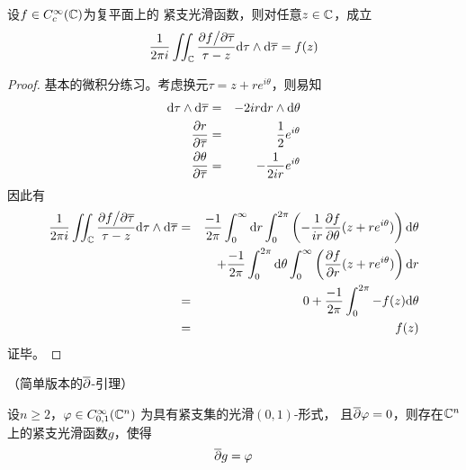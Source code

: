 \begin{lemma}设$f\in C^\infty_c(\mathbb{C})$为复平面上的
紧支光滑函数，则对任意$z\in\mathbb{C}$，成立
$$
  \frac{1}{2\pi i}
  \iint_{\mathbb{C}}
    \frac{\partial f\big/\partial\overline{\tau}}
         {\tau-z}
    \mathrm{d}\tau\wedge\mathrm{d}\overline{\tau}
=f(z)$$
\end{lemma}
\begin{proof}
基本的微积分练习。考虑换元$\tau=z+re^{i\theta}$，则易知
\begin{eqnarray*}
  \mathrm{d}\tau\wedge\mathrm{d}\overline{\tau}&=&-2ir\mathrm{d} r\wedge\mathrm{d}\theta\\
  \frac{\partial r} {\partial \overline{\tau}}&=&\frac{1}{2}e^{i\theta}\\
  \frac{\partial \theta} {\partial \overline{\tau}}&=&-\frac{1}{2ir}e^{i\theta}
\end{eqnarray*}
因此有
\begin{eqnarray*}
     \frac{1}{2\pi i}
     \iint_{\mathbb{C}}
       \frac{\partial f\big/\partial\overline{\tau}}
            {\tau-z}
       \mathrm{d}\tau\wedge\mathrm{d}\overline{\tau}
&=&
     \frac{-1}{2\pi}
       \int_0^\infty\mathrm{d} r
         \int_0^{2\pi}
           \left(
            -\frac{1}{ir}\frac{\partial f} {\partial \theta}(z+re^{i\theta})
           \right)
           \mathrm{d}\theta\\
& &
    +\frac{-1}{2\pi}
     \int_0^{2\pi}\mathrm{d}\theta
       \int_0^\infty
       \left(
         \frac{\partial f} {\partial r}(z+re^{i\theta})
       \right)
       \mathrm{d} r\\
&=&
     0+\frac{-1}{2\pi}
     \int_0^{2\pi}
       -f(z)
       \mathrm{d}\theta\\
&=&
     f(z)
\end{eqnarray*}
证毕。
\end{proof}

\begin{lemma}（简单版本的$\overline{\partial}$-引理）

设$n\geq 2$，$\varphi\in C^\infty_{0,1}(\mathbb{C}^n)$
为具有紧支集的光滑$(0,1)$-形式，
且$\overline{\partial}\varphi=0$，则存在$\mathbb{C}^n$上的紧支光滑函数$g$，使得
$$\overline{\partial} g=\varphi$$
\label{partial-bar引理-简单版本-lemma}
\end{lemma}

